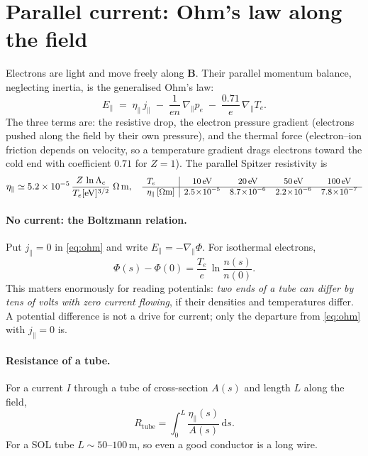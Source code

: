 \documentclass[11pt,a4paper]{article}
\newcommand{\bB}{\mathbf{B}}
\newcommand{\Te}{T_e}
\newcommand{\jpar}{j_\parallel}
\newcommand{\dd}{\mathrm{d}}
\newcommand{\eV}{\,\mathrm{eV}}
\begin{document}
\section{Parallel current: Ohm's law along the field}

Electrons are light and move freely along $\bB$. Their parallel momentum balance, neglecting inertia, is the
generalised Ohm's law:
\begin{equation}
  E_\parallel \;=\; \eta_\parallel\,\jpar \;-\; \frac{1}{e n}\,\nabla_\parallel p_e \;-\; \frac{0.71}{e}\,\nabla_\parallel \Te .
  \label{eq:ohm}
\end{equation}
The three terms are: the resistive drop, the electron pressure gradient (electrons pushed along the field by their own
pressure), and the thermal force (electron--ion friction depends on velocity, so a temperature gradient drags
electrons toward the cold end with coefficient $0.71$ for $Z=1$). The parallel Spitzer resistivity is
\begin{equation}
  \eta_\parallel \simeq 5.2\times10^{-5}\,\frac{Z\,\ln\Lambda_c}{\Te[\mathrm{eV}]^{3/2}}\;\Omega\,\mathrm{m},
  \quad
  {\small\begin{array}{l|cccc}
    \Te & 10\eV & 20\eV & 50\eV & 100\eV \\ \hline
    \eta_\parallel\,[\Omega\mathrm{m}] & 2.5\!\times\!10^{-5} & 8.7\!\times\!10^{-6} & 2.2\!\times\!10^{-6} & 7.8\!\times\!10^{-7}
  \end{array}}
  \label{eq:spitzer}
\end{equation}

\paragraph{No current: the Boltzmann relation.}
Put $\jpar = 0$ in \eqref{eq:ohm} and write $E_\parallel = -\nabla_\parallel\Phi$. For isothermal electrons,
\begin{equation}
  \Phi(s) - \Phi(0) = \frac{\Te}{e}\,\ln\frac{n(s)}{n(0)} .
  \label{eq:boltzmann}
\end{equation}
This matters enormously for reading potentials: \emph{two ends of a tube can differ by tens of volts with zero current
flowing}, if their densities and temperatures differ. A potential difference is not a drive for current; only the
departure from \eqref{eq:ohm} with $\jpar=0$ is.

\paragraph{Resistance of a tube.}
For a current $I$ through a tube of cross-section $A(s)$ and length $L$ along the field,
\begin{equation}
  R_{\mathrm{tube}} = \int_0^{L}\frac{\eta_\parallel(s)}{A(s)}\,\dd s .
  \label{eq:rtube}
\end{equation}
For a SOL tube $L \sim 50$--$100\,$m, so even a good conductor is a long wire.
\end{document}
